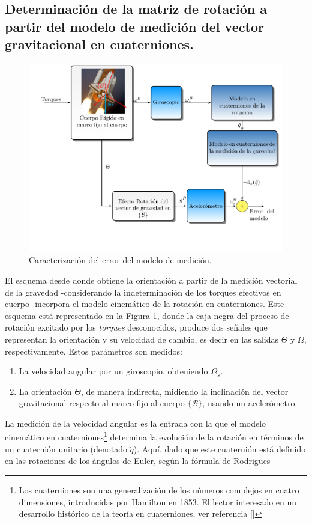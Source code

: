 \documentclass[10pt]{report}
\numberwithin{equation}{chapter}
\numberwithin{algorithm}{chapter}
\newcommand{\marco}[1]{\{\mathcal{#1}\}}
\begin{document}
\subsection{Determinación de la matriz de rotación a partir del modelo de medición del vector gravitacional en cuaterniones.}
\begin{figure} [t]
\begin{center}
\includegraphics[scale=0.850,viewport=20 50 430 330,clip]{ObsOptimo_fig3.pdf}
\caption{Caracterización del error del modelo de medición.}
\label{ObsOptimo_fig2}
\end{center}
\end{figure}
El esquema desde donde obtiene la orientación a partir de la medición vectorial de la gravedad -considerando la indeterminación de los torques efectivos en cuerpo- incorpora el modelo cinemático de la rotación en cuaterniones. Este esquema está representado en la Figura \ref{ObsOptimo_fig2}, donde la caja negra del proceso de rotación excitado por los \emph{torques} desconocidos, produce dos señales que representan la orientación y su velocidad de cambio, es decir en las salidas $\Theta$ y $\Omega$, respectivamente. Estos parámetros son medidos:
\begin{enumerate} 
\item La velocidad angular por un giroscopio, obteniendo $\Omega_s$.
\item La orientación $\Theta$, de manera indirecta, midiendo la inclinación del vector gravitacional respecto al marco fijo al cuerpo $\marco{B}$, usando un acelerómetro.
\end{enumerate}
La medición de la velocidad angular es la entrada con la que el modelo cinemático en cuaterniones\footnote{Los cuaterniones son una generalización de los números complejos en cuatro dimensiones, introducidas por Hamilton en 1853. El lector interesado en un desarrollo histórico de la teoría en cuaterniones, ver referencia [\cite{Warden1976}]} determina la evolución de la rotación en términos de un cuaternión unitario (denotado $\breve{q}$). Aquí, dado que este cuaternión está definido en las rotaciones de los ángulos de Euler, según la fórmula de Rodrigues
\end{document}
